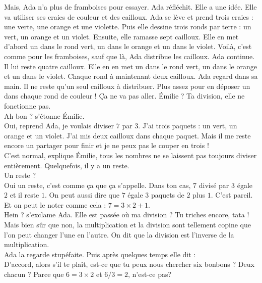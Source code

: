 Mais, Ada n'a plus de framboises pour essayer. Ada réfléchit. Elle a une idée. Elle va utiliser ses craies de couleur et des cailloux.
Ada se lève et prend trois craies : une verte, une orange et une violette. Puis elle dessine trois ronds par terre : un vert, un orange et un violet. Ensuite, elle ramasse sept cailloux. Elle en met d'abord un dans le rond vert, un dans le orange et un dans le violet. Voilà, c'est comme pour les framboises, sauf que là, Ada distribue les cailloux. Ada continue. Il lui reste quatre cailloux. Elle en en met un dans le rond vert, un dans le orange et un dans le violet. Chaque rond à maintenant deux cailloux. Ada regard dans sa main. Il ne reste qu'un seul cailloux à distribuer. Plus assez pour en déposer un dans chaque rond de couleur ! Ça ne va pas aller.
\guillemotleft Émilie ? Ta division, elle ne fonctionne pas.\\
\mdash Ah bon ? s'étonne Émilie. \\
\mdash Oui, reprend Ada, je voulais diviser $7$ par $3$. J'ai trois paquets : un vert, un orange et un violet. J'ai mis deux cailloux dans chaque paquet. Mais il me reste encore un partager pour finir et je ne peux pas le couper en trois !\\
\mdash C'est normal, explique Émilie, tous les nombres ne se laissent pas toujours diviser entièrement. Quelquefois, il y a un reste. \\
\mdash Un reste ? \\
\mdash Oui un reste, c'est comme ça que ça s'appelle. Dans ton cas, $7$ divisé par $3$ égale $2$ et il reste $1$. On peut aussi dire que $7$ égale $3$ paquets de $2$ plus $1$. C'est pareil. Et on peut le noter comme cela : $7=3\times2+1$. \\
\mdash Hein ? s'exclame Ada. Elle est passée où ma division ? Tu triches encore, tata ! \\
\mdash Mais bien sûr que non, la multiplication et la division sont tellement copine que l'on peut changer l'une en l'autre. On dit que la division est l'inverse de la multiplication. \guillemotright\\
Ada la regarde stupéfaite. Puis après quelques temps elle dit : \\
\guillemotleft D'accord, alors s'il te plaît, est-ce que tu peux nous chercher six bonbons ? Deux chacun ? Parce que $6 = 3 \times 2$ et $6 / 3 = 2$, n'est-ce pas? \guillemotright 

